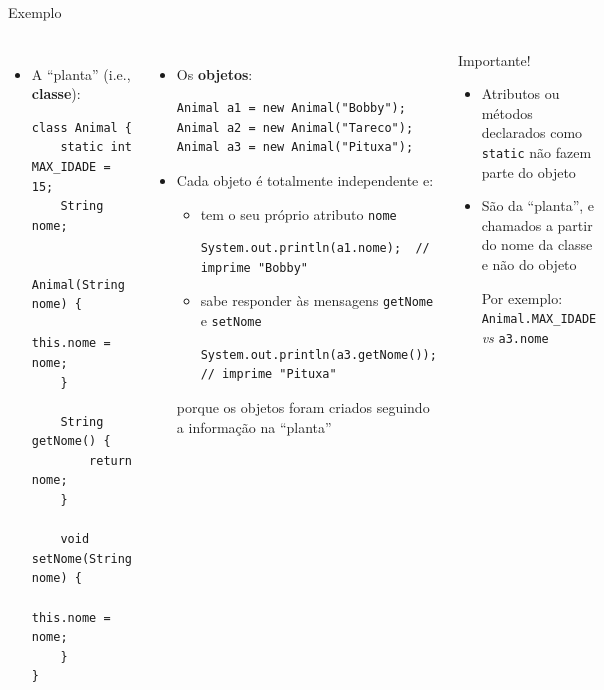 \documentclass[portuguese, aspectratio=169, xcolor=table]{beamer}
\begin{document}
\begin{frame}[fragile]{Exemplo}
\scriptsize
\begin{columns}
\begin{itemize}
    \item A ``planta'' (i.e., \textbf{classe}):
\begin{verbatim}
class Animal {
    static int MAX_IDADE = 15;
    String nome;

    Animal(String nome) {
        this.nome = nome;
    }

    String getNome() {
        return nome;
    }

    void setNome(String nome) {
        this.nome = nome;
    }
}
\end{verbatim}
\end{itemize}
\begin{itemize}
\item Os \textbf{objetos}:
\begin{verbatim}
Animal a1 = new Animal("Bobby");
Animal a2 = new Animal("Tareco");
Animal a3 = new Animal("Pituxa");
\end{verbatim}
\item Cada objeto é totalmente independente e:
\begin{itemize}
    \scriptsize
    \item tem o seu próprio atributo \texttt{nome}
\begin{verbatim}
System.out.println(a1.nome);  // imprime "Bobby"
\end{verbatim}
\item sabe responder às mensagens \texttt{getNome} e \texttt{setNome}\begin{verbatim}
System.out.println(a3.getNome());  // imprime "Pituxa"
\end{verbatim}
\end{itemize}
porque os objetos foram criados seguindo a informação na ``planta''
\end{itemize}
\vfill

\begin{alertblock}{Importante!}
 \begin{itemize}
     \item Atributos ou métodos declarados como \texttt{static} não fazem parte do objeto
     \item São da ``planta'', e chamados a partir do nome da classe e não do objeto

     Por exemplo: \texttt{Animal.MAX_IDADE}  \textit{vs} \texttt{a3.nome}
 \end{itemize}
\end{alertblock}
\end{columns}
\end{frame}
\end{document}
